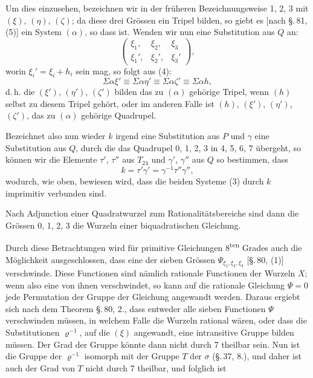 
Um dies einzusehen, bezeichnen wir in der früheren Bezeichnungsweise 1, 2, 3 mit $(\xi)$, $(\eta)$, $(\zeta)$; da diese drei Grössen ein Tripel bilden, so giebt es [nach \S.\,81, (5)] ein System $(\alpha)$, so dass
ist. Wenden wir nun eine Substitution aus $Q$ an:
\[
\begin{pmatrix} \xi_1, & \xi_2, & \xi_3 \\ \xi_1', & \xi_2', & \xi_3' \end{pmatrix},
\]
worin $\xi_i' = \xi_i + h_i$ sein mag, so folgt aus (4):
\[
\Sigma\alpha\xi' \equiv \Sigma\alpha\eta' \equiv \Sigma\alpha\zeta' \equiv \Sigma\alpha h,
\]
d.\,h. die $(\xi')$, $(\eta')$, $(\zeta')$ bilden das zu $(\alpha)$ gehörige Tripel, wenn $(h)$ selbst zu diesem Tripel gehört, oder im anderen Falle ist $(h)$, $(\xi')$, $(\eta')$, $(\zeta')$, das zu $(\alpha)$ gehörige Quadrupel.

Bezeichnet also nun wieder $k$ irgend eine Substitution aus $P$ und $\gamma$ eine Substitution aus $Q$, durch die das Quadrupel 0, 1, 2, 3 in 4, 5, 6, 7 übergeht, so können wir die Elemente $\tau'$, $\tau''$ aus $T_{24}$ und $\gamma'$, $\gamma''$ aus $Q$ so bestimmen, dass
\[
k = \tau'\gamma' = \gamma^{-1}\tau''\gamma'',
\]
wodurch, wie oben, bewiesen wird, dass die beiden Systeme (3) durch $k$ imprimitiv verbunden sind.

Nach Adjunction einer Quadratwurzel zum Rationalitätsbereiche sind dann die Grössen 0, 1, 2, 3 die Wurzeln einer biquadratischen Gleichung.

Durch diese Betrachtungen wird für primitive Gleichungen 8\textsuperscript{ten} Grades auch die Möglichkeit ausgeschlossen, dass eine der sieben Grössen $\Psi_{\xi_1,\xi_2,\xi_3}$ [\S.\,80, (1)] verschwinde. Diese Functionen sind nämlich rationale Functionen der Wurzeln $X$; wenn also eine von ihnen verschwindet, so kann auf die rationale Gleichung $\Psi = 0$ jede Permutation der Gruppe der Gleichung angewandt werden. Daraus ergiebt sich nach dem Theorem \S.\,80, 2., dass entweder alle sieben Functionen $\Psi$ verschwinden müssen, in welchem Falle die Wurzeln rational wären, oder dass die Substitutionen $\varrho^{-1}$, auf die $(\xi)$ angewandt, eine intransitive Gruppe bilden müssen. Der Grad der Gruppe könnte dann nicht durch 7 theilbar sein. Nun ist die Gruppe der $\varrho^{-1}$ isomorph mit der Gruppe $T$ der $\sigma$ (\S.\,37, 8.), und daher ist auch der Grad von $T$ nicht durch 7 theilbar, und folglich ist
